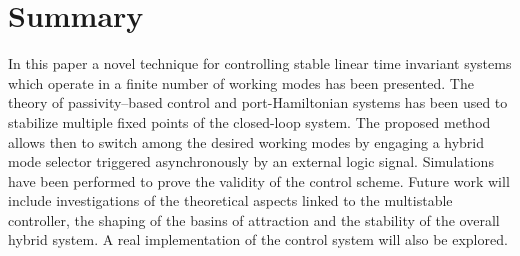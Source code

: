 \section{Summary}
In this paper a novel technique for controlling stable linear time invariant systems which operate in a finite number of working modes has been presented. 
The theory of passivity--based control and port-Hamiltonian systems has been used to stabilize multiple fixed points of the closed-loop system. The proposed method allows then to switch among the desired working modes by engaging a hybrid mode selector triggered asynchronously by an external logic signal. Simulations have been performed to prove the validity of the control scheme.
Future work will include investigations of the theoretical aspects linked to the multistable controller, the shaping of the basins of attraction and the stability of the overall hybrid system. A real implementation of the control system will also be explored.
